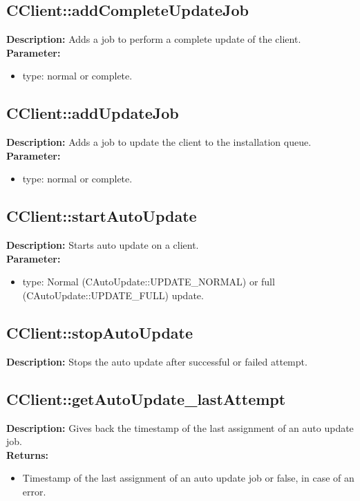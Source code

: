\subsection{CClient::addCompleteUpdateJob}
\textbf{Description:} Adds a job to perform a complete update of the client.\\
\textbf{Parameter:}
\begin{itemize}
\item type: normal or complete.
\end{itemize}

\subsection{CClient::addUpdateJob}
\textbf{Description:} Adds a job to update the client to the installation queue.\\
\textbf{Parameter:}
\begin{itemize}
\item type: normal or complete.
\end{itemize}

\subsection{CClient::startAutoUpdate}
\textbf{Description:} Starts auto update on a client.\\
\textbf{Parameter:}
\begin{itemize}
\item type: Normal (CAutoUpdate::UPDATE\_NORMAL) or full (CAutoUpdate::UPDATE\_FULL) update.
\end{itemize}

\subsection{CClient::stopAutoUpdate}
\textbf{Description:} Stops the auto update after successful or failed attempt.\\

\subsection{CClient::getAutoUpdate\_lastAttempt}
\textbf{Description:} Gives back the timestamp of the last assignment of an auto update job.\\
\textbf{Returns:}
\begin{itemize}
\item Timestamp of the last assignment of an auto update job or false, in case of an error.
\end{itemize}


